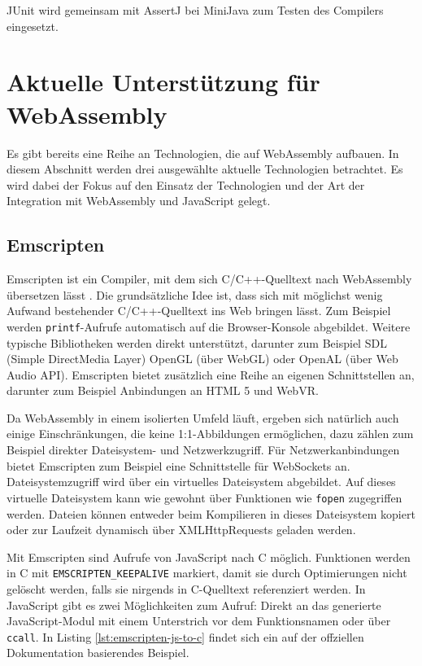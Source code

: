 JUnit wird gemeinsam mit AssertJ bei MiniJava zum Testen des Compilers eingesetzt.

\section{Aktuelle Unterstützung für WebAssembly}
Es gibt bereits eine Reihe an Technologien, die auf WebAssembly aufbauen. In diesem Abschnitt werden drei ausgewählte aktuelle Technologien betrachtet. Es wird dabei der Fokus auf den Einsatz der Technologien und der Art der Integration mit WebAssembly und JavaScript gelegt.

\subsection{Emscripten}

Emscripten ist ein Compiler, mit dem sich C/C++-Quelltext nach WebAssembly übersetzen lässt \cite{Emscripten}. Die grundsätzliche Idee ist, dass sich mit möglichst wenig Aufwand bestehender C/C++-Quelltext ins Web bringen lässt. Zum Beispiel werden \lstinline{printf}-Aufrufe automatisch auf die Browser-Konsole abgebildet. Weitere typische Bibliotheken werden direkt unterstützt, darunter zum Beispiel SDL (Simple DirectMedia Layer) OpenGL (über WebGL) oder OpenAL (über Web Audio API). Emscripten bietet zusätzlich eine Reihe an eigenen Schnittstellen an, darunter zum Beispiel Anbindungen an HTML 5 und WebVR.

Da WebAssembly in einem isolierten Umfeld läuft, ergeben sich natürlich auch einige Einschränkungen, die keine 1:1-Abbildungen ermöglichen, dazu zählen zum Beispiel direkter Dateisystem- und Netzwerkzugriff. Für Netzwerkanbindungen bietet Emscripten zum Beispiel eine Schnittstelle für WebSockets an. Dateisystemzugriff wird über ein virtuelles Dateisystem abgebildet. Auf dieses virtuelle Dateisystem kann wie gewohnt über Funktionen wie \lstinline{fopen} zugegriffen werden. Dateien können entweder beim Kompilieren in dieses Dateisystem kopiert oder zur Laufzeit dynamisch über XMLHttpRequests geladen werden.

Mit Emscripten sind Aufrufe von JavaScript nach C möglich. Funktionen werden in C mit \lstinline{EMSCRIPTEN_KEEPALIVE} markiert, damit sie durch Optimierungen nicht gelöscht werden, falls sie nirgends in C-Quelltext referenziert werden. In JavaScript gibt es zwei Möglichkeiten zum Aufruf: Direkt an das generierte JavaScript-Modul mit einem Unterstrich vor dem Funktionsnamen oder über \lstinline{ccall}. In Listing \ref{lst:emscripten-js-to-c} findet sich ein auf der offziellen Dokumentation basierendes Beispiel.

